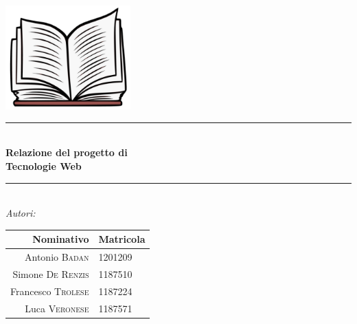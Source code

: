 \documentclass[12pt,a4paper,headings=optiontohead]{article}
\begin{document}
	
	
	\begin{titlepage}
	
	\newcommand{\HRule}{\rule{\linewidth}{0.5mm}} %
	
	\center%
	 
	
	
	
	
	\includegraphics[height=4cm]{../img/btllogo.png}\\[0.3cm]
	
	\HRule \\[0.4cm]
	{ \huge \bfseries Relazione del progetto di}\\
	{ \huge \bfseries Tecnologie Web\\[0.15 cm]} %
	\HRule \\[1.5cm]
	 
	\emph{\Large{Autori:}}\\
	\renewcommand{\arraystretch}{1.4}
	 \begin{center}
	 \begin{tabular}{r|l}	
		\textbf{Nominativo} & \textbf{Matricola}\\ \hline
	Antonio \textsc{Badan} & 1201209\\
	Simone \textsc{De Renzis} & 1187510\\
	Francesco \textsc{Trolese} & 1187224\\
	Luca \textsc{Veronese} & 1187571\\
	 \end{tabular}
	 \end{center}
	

\end{titlepage}
\end{document}
